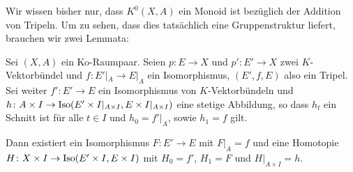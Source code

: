 Wir wissen bisher nur, dass $K^0(X,A)$ ein Monoid ist bezüglich der Addition von Tripeln. Um zu sehen, dass dies tatsächlich eine Gruppenstruktur liefert, brauchen wir zwei 
Lemmata: 


\begin{lemma}[label=sub:33,{name=[Existenz eines Bündelisomorphismus und einer Homotopie]}]
Sei $(X,A)$ ein Ko-Raumpaar.
Seien $p \colon E \to X$ und $p' \colon E' \to X$ zwei $K$-Vektorbündel und $f \colon E'|_A \to E|_A$ ein Isomorphismus, $(E',f,E)$ also ein Tripel. 
Sei weiter $f' \colon E' \to E$ ein Isomorphismus von $K$-Vektorbündeln und $h \colon A \times I \to \operatorname{Iso}(E'\times I|_{A\times I},E\times I|_{A\times I})$ eine stetige 
Abbildung, so dass $h_t$ ein Schnitt ist für alle $t \in I$ und $h_0=f'|_A$, sowie $h_1=f$ gilt.

Dann existiert ein Isomorphismus $F \colon E' \to E$ mit $F|_A=f$ und eine Homotopie $H \colon X \times I \to \operatorname{Iso}(E' \times I,E\times I)$ mit $H_0=f'$, $H_1=F$ und $H|_{A\times I}=h$.	
\end{lemma}
